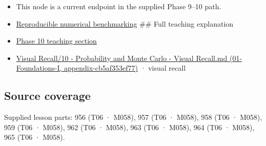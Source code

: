 \begin{itemize}
\item
  This node is a current endpoint in the supplied Phase 9--10 path.
\item
  \hyperref[appendix-b9db93e28371]{Reproducible numerical benchmarking} \#\# Full teaching explanation
\item
  \href{Continuous\%20Notes/Computing\%20Foundations\%20-\%20From\%20Bits\%20to\%20C++\%20and\%20Systems\%20APIs\#10.\%20Inference\%20and\%20error\%20metrics\%20need\%20explicit\%20assumptions}{Phase 10 teaching section}
\item
  \href{}{Visual Recall/10 - Probability and Monte Carlo - Visual Recall.md (01-Foundations-I, appendix-cb5af353ef77)} · visual recall
\end{itemize}

\subsection{Source coverage}\label{source-coverage}

Supplied lesson parts: 956 (T06 · M058), 957 (T06 · M058), 958 (T06 · M058), 959 (T06 · M058), 962 (T06 · M058), 963 (T06 · M058), 964 (T06 · M058), 965 (T06 · M058).

